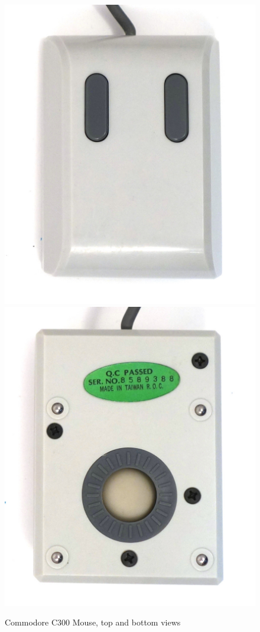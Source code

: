 \documentclass[11pt, a4paper]{article}
\begin{document}
\begin{figure}[h]
    \centering
    \includegraphics[scale=0.75]{1986_commodore_c300_mouse/3verh_60.jpg}
    \includegraphics[scale=0.75]{1986_commodore_c300_mouse/3niz_60.jpg}
    \caption{Commodore C300 Mouse, top and bottom views}
    \label{fig:C300TopAndBottom}
\end{figure}
\end{document}
